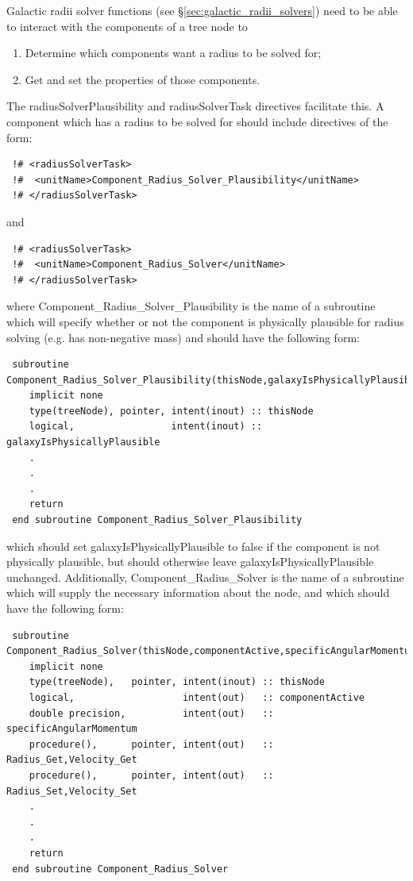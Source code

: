 Galactic radii solver functions (see \S\ref{sec:galactic_radii_solvers}) need to be able to interact with the components of a tree node to
\begin{enumerate}
 \item Determine which components want a radius to be solved for;
 \item Get and set the properties of those components.
\end{enumerate}
The  {\normalfont \ttfamily radiusSolverPlausibility} and {\normalfont \ttfamily radiusSolverTask} directives facilitate this. A component which has a radius to be solved for should include directives of the form:
\begin{verbatim}
 !# <radiusSolverTask>
 !#  <unitName>Component_Radius_Solver_Plausibility</unitName>
 !# </radiusSolverTask>
\end{verbatim}
and
\begin{verbatim}
 !# <radiusSolverTask>
 !#  <unitName>Component_Radius_Solver</unitName>
 !# </radiusSolverTask>
\end{verbatim}
where {\normalfont \ttfamily Component\_Radius\_Solver\_Plausibility} is the name of a subroutine which will specify whether or not the component is physically plausible for radius solving (e.g. has non-negative mass) and should have the following form:
\begin{verbatim}
 subroutine Component_Radius_Solver_Plausibility(thisNode,galaxyIsPhysicallyPlausible)
    implicit none
    type(treeNode), pointer, intent(inout) :: thisNode
    logical,                 intent(inout) :: galaxyIsPhysicallyPlausible
    .
    .
    .
    return
 end subroutine Component_Radius_Solver_Plausibility
\end{verbatim}
which should set {\normalfont \ttfamily galaxyIsPhysicallyPlausible} to false if the component is not physically plausible, but should otherwise leave {\normalfont \ttfamily galaxyIsPhysicallyPlausible} unchanged. Additionally, {\normalfont \ttfamily Component\_Radius\_Solver} is the name of a subroutine which will supply the necessary information about the node, and which should have the following form:
\begin{verbatim}
 subroutine Component_Radius_Solver(thisNode,componentActive,specificAngularMomentum,Radius_Get,Radius_Set,Velocity_Get,Velocity_Set)
    implicit none
    type(treeNode),   pointer, intent(inout) :: thisNode
    logical,                   intent(out)   :: componentActive
    double precision,          intent(out)   :: specificAngularMomentum
    procedure(),      pointer, intent(out)   :: Radius_Get,Velocity_Get
    procedure(),      pointer, intent(out)   :: Radius_Set,Velocity_Set
    .
    .
    .
    return
 end subroutine Component_Radius_Solver
\end{verbatim}
